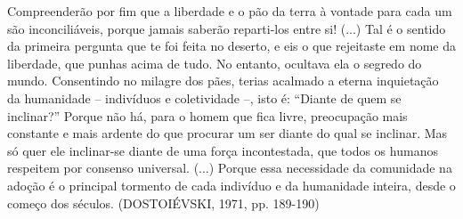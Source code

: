 Compreenderão por fim que a liberdade e o pão da terra à vontade para
cada um são inconciliáveis, porque jamais saberão reparti-los entre si!
(...) Tal é o sentido da primeira pergunta que te foi feita no deserto,
e eis o que rejeitaste em nome da liberdade, que punhas acima de tudo.
No entanto, ocultava ela o segredo do mundo. Consentindo no milagre dos
pães, terias acalmado a eterna inquietação da humanidade -- indivíduos e
coletividade --, isto é: ``Diante de quem se inclinar?'' Porque não há,
para o homem que fica livre, preocupação mais constante e mais ardente
do que procurar um ser diante do qual se inclinar. Mas só quer ele
inclinar-se diante de uma força incontestada, que todos os humanos
respeitem por consenso universal. (...) Porque essa necessidade da
comunidade na adoção é o principal tormento de cada indivíduo e da
humanidade inteira, desde o começo dos séculos. (DOSTOIÉVSKI, 1971, pp.
189-190)

